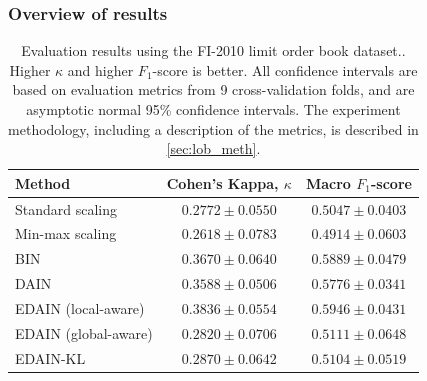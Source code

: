 \documentclass{statsmsc}
\begin{document}
{\subsubsection{Overview of results}%
\label{ssub:Overview of results}

\begin{table}[htp]
    \centering
    \begin{tabular}{lcc}
        \toprule
        Method & Cohen's Kappa, $\kappa$ & Macro $F_1$-score \\
        \midrule
        Standard scaling & $0.2772 \pm 0.0550$ & $0.5047 \pm 0.0403$ \\
        Min-max scaling & $0.2618 \pm 0.0783$ & $0.4914 \pm 0.0603$ \\
        BIN & $0.3670 \pm 0.0640$ & $0.5889 \pm 0.0479$ \\
        DAIN & $0.3588 \pm 0.0506$ & $0.5776 \pm 0.0341$ \\
        EDAIN (local-aware) & $\bm{0.3836 \pm 0.0554}$ & $\bm{0.5946 \pm 0.0431}$ \\
        EDAIN (global-aware) & $0.2820 \pm 0.0706$ & $0.5111 \pm 0.0648$ \\
        EDAIN-KL & $0.2870 \pm 0.0642$ & $0.5104 \pm 0.0519$ \\
        \bottomrule
    \end{tabular}%
    \caption{
        Evaluation results using the FI-2010 limit order book dataset..
        Higher $\kappa$ and higher $F_1$-score is better.
        All confidence intervals are based on evaluation metrics from 9 cross-validation folds,
        and are asymptotic normal 95\% confidence intervals.
        The experiment methodology, including a description of the metrics,
        is described in  \cref{sec:lob_meth}.
    }%
    \label{tab:lob_performance}%
\end{table}

}
\end{document}
